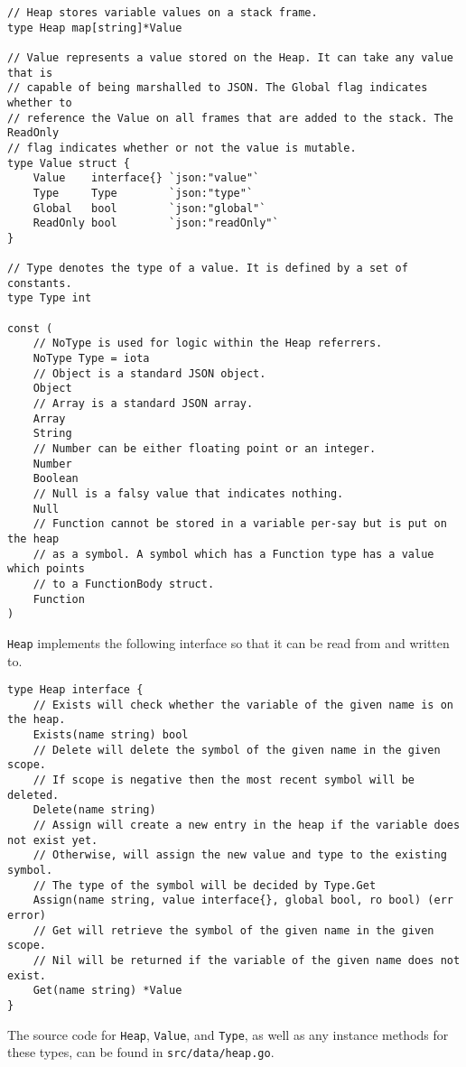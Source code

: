\begin{verbatim}
// Heap stores variable values on a stack frame.
type Heap map[string]*Value

// Value represents a value stored on the Heap. It can take any value that is
// capable of being marshalled to JSON. The Global flag indicates whether to
// reference the Value on all frames that are added to the stack. The ReadOnly
// flag indicates whether or not the value is mutable.
type Value struct {
    Value    interface{} `json:"value"`
    Type     Type        `json:"type"`
    Global   bool        `json:"global"`
    ReadOnly bool        `json:"readOnly"`
}

// Type denotes the type of a value. It is defined by a set of constants.
type Type int

const (
    // NoType is used for logic within the Heap referrers.
    NoType Type = iota
    // Object is a standard JSON object.
    Object
    // Array is a standard JSON array.
    Array
    String
    // Number can be either floating point or an integer.
    Number
    Boolean
    // Null is a falsy value that indicates nothing.
    Null
    // Function cannot be stored in a variable per-say but is put on the heap
    // as a symbol. A symbol which has a Function type has a value which points
    // to a FunctionBody struct.
    Function
)
\end{verbatim}

\verb|Heap| implements the following interface so that it can be read from and written to.

\begin{verbatim}
type Heap interface {
    // Exists will check whether the variable of the given name is on the heap.
    Exists(name string) bool
    // Delete will delete the symbol of the given name in the given scope.
    // If scope is negative then the most recent symbol will be deleted.
    Delete(name string)
    // Assign will create a new entry in the heap if the variable does not exist yet.
    // Otherwise, will assign the new value and type to the existing symbol.
    // The type of the symbol will be decided by Type.Get
    Assign(name string, value interface{}, global bool, ro bool) (err error)
    // Get will retrieve the symbol of the given name in the given scope.
    // Nil will be returned if the variable of the given name does not exist.
    Get(name string) *Value
}
\end{verbatim}

The source code for \verb|Heap|, \verb|Value|, and \verb|Type|, as well as any instance methods for these types, can be found in \verb|src/data/heap.go|.


